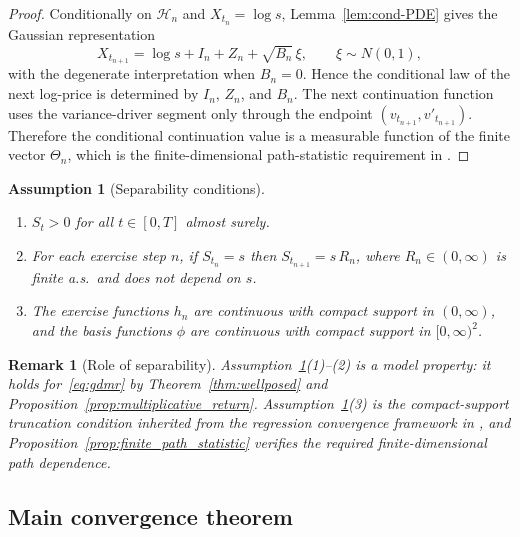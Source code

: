 \documentclass[pdflatex,sn-mathphys-num]{sn-jnl}
\theoremstyle{thmstyleone}%
\theoremstyle{thmstylethree}%
\newtheorem{assumption}[theorem]{Assumption}
\theoremstyle{thmstyletwo}%
\newtheorem{remark}[theorem]{Remark}
\begin{document}
\begin{proof}
Conditionally on $\mathcal H_n$ and $X_{t_n}=\log s$, Lemma~\ref{lem:cond-PDE} gives the Gaussian representation
\[
X_{t_{n+1}}=\log s+I_n+Z_n+\sqrt{B_n}\,\xi,
\qquad \xi\sim N(0,1),
\]
with the degenerate interpretation when $B_n=0$. Hence the conditional law of the next log-price is determined
by $I_n$, $Z_n$, and $B_n$. The next continuation function uses the variance-driver segment only through the
endpoint $(v_{t_{n+1}},v'_{t_{n+1}})$. Therefore the conditional continuation value is a measurable function of
the finite vector $\Theta_n$, which is the finite-dimensional path-statistic requirement in
\cite{farahany2020mixing}.
\end{proof}

\begin{assumption}[Separability conditions]
\label{ass:separability}
\begin{enumerate}
\item $S_t>0$ for all $t\in[0,T]$ almost surely.
\item For each exercise step $n$, if $S_{t_n}=s$ then $S_{t_{n+1}}=s\,R_n$, where
$R_n\in(0,\infty)$ is finite a.s.\ and does not depend on $s$.
\item The exercise functions $h_n$ are continuous with compact support in $(0,\infty)$, and the basis functions
$\phi$ are continuous with compact support in $[0,\infty)^2$.
\end{enumerate}
\end{assumption}

\begin{remark}[Role of separability]\label{rem:role-separability}
Assumption~\ref{ass:separability}(1)--(2) is a model property: it holds for~\eqref{eq:gdmr} by Theorem~\ref{thm:wellposed}
and Proposition~\ref{prop:multiplicative_return}. Assumption~\ref{ass:separability}(3) is the compact-support
truncation condition inherited from the regression convergence framework in \cite{farahany2020mixing}, and
Proposition~\ref{prop:finite_path_statistic} verifies the required finite-dimensional path dependence.
\end{remark}



\subsection{Main convergence theorem}
\label{subsec:main_convergence}
\end{document}
